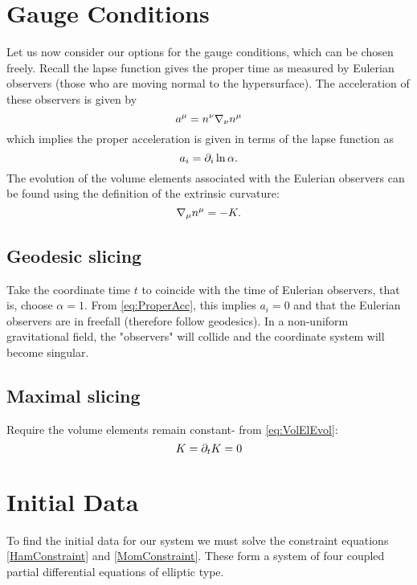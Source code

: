 \section{Gauge Conditions}
Let us now consider our options for the gauge conditions, which can be chosen freely. Recall the lapse function gives the proper time as measured by Eulerian observers (those who are moving normal to the hypersurface). The acceleration of these observers is given by 
\begin{equation}
a^\mu = n^\nu {\nabla}_\nu n^\mu
\end{equation} 
which implies the proper acceleration is given in terms of the lapse function as 
\begin{equation}\label{eq:ProperAcc}
a_i = {\partial}_i \ln \alpha.
\end{equation}
The evolution of the volume elements associated with the Eulerian observers can be found using the definition of the extrinsic curvature:
\begin{equation}\label{eq:VolElEvol}
{\nabla}_{\mu}n^{\mu}=-K.
\end{equation}

\subsection{Geodesic slicing}
Take the coordinate time $t$ to coincide with the time of Eulerian observers, that is, choose $\alpha=1$. From \ref{eq:ProperAcc}, this implies $a_i=0$ and that the Eulerian observers are in freefall (therefore follow geodesics). In a non-uniform gravitational field, the "observers" will collide and the coordinate system will become singular.

\subsection{Maximal slicing}
Require the volume elements remain constant- from  \ref{eq:VolElEvol}:
\begin{equation}
K = {\partial}_t K =0
\end{equation}


\section{Initial Data}
To find the initial data for our system we must solve the constraint equations \ref{HamConstraint} and \ref{MomConstraint}. These form a system of four coupled partial differential equations of elliptic type. 

